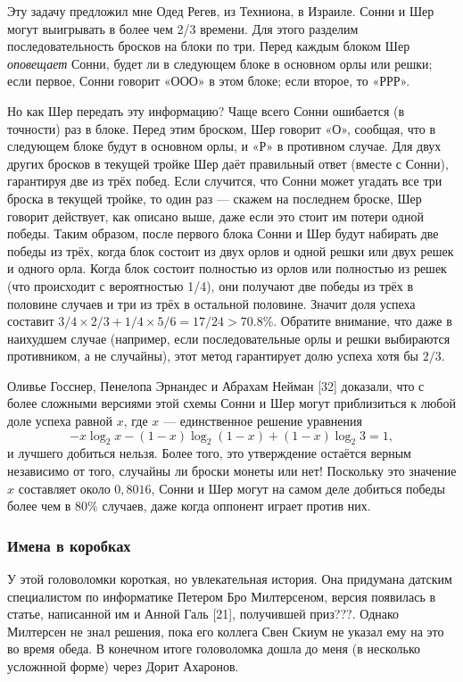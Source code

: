 Эту задачу предложил мне Одед Регев, из Техниона, в Израиле.
Сонни и Шер могут выигрывать в более чем 2/3 времени.
Для этого разделим последовательность бросков на блоки по три.
Перед каждым блоком Шер \emph{оповещает} Сонни, будет ли в следующем блоке в основном орлы или решки;
если первое, Сонни говорит «ООО» в этом блоке; если второе, то «РРР».

Но как Шер передать эту информацию?
Чаще всего Сонни ошибается (в точности) раз в блоке.
Перед этим броском, Шер говорит «О», сообщая, что в следующем блоке будут в основном орлы, и «Р» в противном случае.
Для двух других бросков в текущей тройке Шер даёт правильный ответ (вместе с Сонни), гарантируя две из трёх побед.
Если случится, что Сонни может угадать все три броска в текущей тройке,
то один раз --- скажем на последнем броске, Шер говорит действует, как описано выше, даже если это стоит им потери одной победы.
Таким образом, после первого блока Сонни и Шер будут набирать две победы из трёх, когда блок состоит из двух орлов и одной решки или двух решек и одного орла.
Когда блок состоит полностью из орлов или полностью из решек (что происходит с вероятностью 1/4), они получают две победы из трёх в половине случаев и три из трёх в остальной половине.
Значит доля успеха составит $3/4 \times 2/3 + 1/4 \times 5/6 = 17/24 > 70.8\%$.
Обратите внимание, что даже в наихудшем случае (например, если последовательные орлы и решки выбираются противником, а не случайны), этот метод гарантирует долю успеха хотя бы $2/3$.

Оливье Госснер, Пенелопа Эрнандес и Абрахам Нейман [32] доказали, что с более сложными версиями этой схемы Сонни и Шер могут приблизиться к любой доле успеха равной $x$, где $x$ --- единственное решение уравнения
\[-x \log_2 x - (1 - x) \log_2 (1 - x) + (1 - x) \log_2 3 = 1,\]
и лучшего добиться нельзя.
Более того, это утверждение остаётся верным независимо от того, случайны ли броски монеты или нет!
Поскольку это значение $x$ составляет около $0{,}8016$, Сонни и Шер могут на самом деле добиться победы более чем в $80\%$ случаев, даже когда оппонент играет против них.

\subsubsection*{Имена в коробках}

У этой головоломки короткая, но увлекательная история.
Она придумана датским специалистом по информатике Петером Бро Милтерсеном, версия появилась в статье, написанной им и Анной Галь [21], получившей приз???.
Однако Милтерсен не знал  решения, пока его коллега Свен Скиум не указал ему на это во время обеда.
В конечном итоге головоломка дошла до меня (в несколько усложнной форме) через Дорит Ахаронов.

